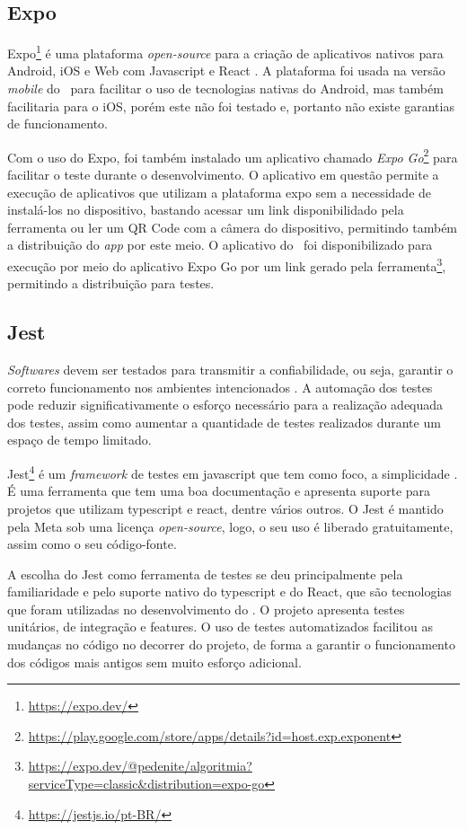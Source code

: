 \subsection{Expo}

Expo\footnote{\url{https://expo.dev/}} é uma plataforma \textit{open-source} para a criação de aplicativos nativos para Android, iOS e Web com Javascript e React \cite{expo}. A plataforma foi usada na versão \textit{mobile} do \appName\ para facilitar o uso de tecnologias nativas do Android, mas também facilitaria para o iOS, porém este não foi testado e, portanto não existe garantias de funcionamento.

Com o uso do Expo, foi também instalado um aplicativo chamado \textit{Expo Go}\footnote{\url{https://play.google.com/store/apps/details?id=host.exp.exponent}} para facilitar o teste durante o desenvolvimento. O aplicativo em questão permite a execução de aplicativos que utilizam a plataforma expo sem a necessidade de instalá-los no dispositivo, bastando acessar um link disponibilidado pela ferramenta ou ler um QR Code com a câmera do dispositivo, permitindo também a distribuição do \textit{app} por este meio. O aplicativo do \appName\ foi disponibilizado para execução por meio do aplicativo Expo Go por um link gerado pela ferramenta\footnote{\url{https://expo.dev/@pedenite/algoritmia?serviceType=classic&distribution=expo-go}}, permitindo a distribuição para testes.

\subsection{Jest}

\textit{Softwares} devem ser testados para transmitir a confiabilidade, ou seja, garantir o correto funcionamento nos ambientes intencionados \cite{test_automation}. A automação dos testes pode reduzir significativamente o esforço necessário para a realização adequada dos testes, assim como aumentar a quantidade de testes realizados durante um espaço de tempo limitado.

Jest\footnote{\url{https://jestjs.io/pt-BR/}} é um \textit{framework} de testes em javascript que tem como foco, a simplicidade \cite{jest}. É uma ferramenta que tem uma boa documentação e apresenta suporte para projetos que utilizam typescript e react, dentre vários outros. O Jest é mantido pela Meta sob uma licença \textit{open-source}, logo, o seu uso é liberado gratuitamente, assim como o seu código-fonte.

A escolha do Jest como ferramenta de testes se deu principalmente pela familiaridade e pelo suporte nativo do typescript e do React, que são tecnologias que foram utilizadas no desenvolvimento do \appName. O projeto apresenta testes unitários, de integração e features. O uso de testes automatizados facilitou as mudanças no código no decorrer do projeto, de forma a garantir o funcionamento dos códigos mais antigos sem muito esforço adicional.

